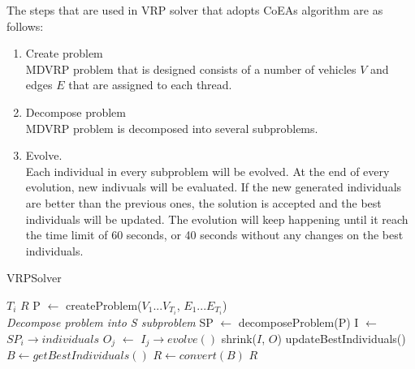 \documentclass[conference]{IEEEtran}
\begin{document}
The steps that are used in VRP solver that adopts CoEAs algorithm are as follows:
\begin{enumerate}
	\item Create problem \\
	MDVRP problem that is designed consists of a number of vehicles $V$ and edges $E$ that are assigned to each thread. 
	\item Decompose problem \\
	MDVRP problem is decomposed into several subproblems. 
	\item Evolve. \\
	Each individual in every subproblem will be evolved. At the end of every evolution, new indivuals will be evaluated. If the new generated individuals are better than the previous ones, the solution is accepted and the best individuals will be updated. The evolution will keep happening until it reach the time limit of 60 seconds, or 40 seconds without any changes on the best individuals. 
\end{enumerate}


\begin{algorithm}[h]
	\caption{VRPSolver}
	\label{alg:vrp-solver}
	\begin{algorithmic}[1]
		\renewcommand{\algorithmicrequire}{\textbf{Input:}}
		\renewcommand{\algorithmicensure}{\textbf{Output:}}
		\REQUIRE $T_i$
		\ENSURE  $R$
		\STATE P $\leftarrow$ createProblem($V_1...V_{T_i}$, $E_1...E_{T_i}$)
		\\ \textit{Decompose problem into S subproblem}
		\STATE SP $\leftarrow$ decomposeProblem(P)
				\STATE I $\leftarrow$ $SP_i \rightarrow individuals$
					\STATE $O_j$ $\leftarrow$ $I_j \rightarrow evolve()$
				\ENDFOR
				\STATE shrink($I$, $O$)
			\ENDFOR
			\STATE updateBestIndividuals()
		\ENDWHILE
		\STATE $B \leftarrow getBestIndividuals()$ 
		\STATE $R \leftarrow convert(B)$ 
		\RETURN $R$
	\end{algorithmic}
\end{algorithm}


\end{document}

